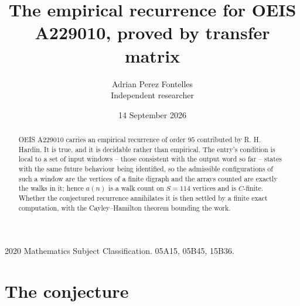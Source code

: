 \documentclass[11pt,a4paper]{article}
\title{The empirical recurrence for OEIS A229010, proved by transfer matrix}
\author{Adrian Perez Fontelles\\ \small Independent researcher}
\date{14 September 2026}
\theoremstyle{plain}
\theoremstyle{definition}
\begin{document}
\maketitle

\begin{abstract}
OEIS A229010 carries an empirical recurrence of order $95$ contributed by R. H. Hardin. It is
true, and it is decidable rather than empirical. The entry's condition is local to a set of input windows -- those consistent with the output word so far -- states with the same future behaviour being identified, so
the admissible configurations of such a window are the vertices of a finite digraph and the
arrays counted are exactly the walks in it; hence $a(n)$ is a walk count on $S=114$ vertices
and is $C$-finite. Whether the conjectured recurrence annihilates it is then settled by a
finite exact computation, with the Cayley--Hamilton theorem bounding the work.
\end{abstract}

\noindent\small 2020 Mathematics Subject Classification. 05A15, 05B45, 15B36.\normalsize

\section{The conjecture}
\end{document}
